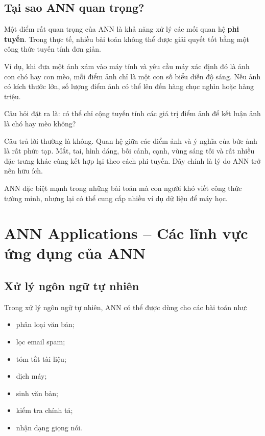 \subsection{Tại sao ANN quan trọng?}

Một điểm rất quan trọng của ANN là khả năng xử lý các mối quan hệ \textbf{phi tuyến}. Trong thực tế, nhiều bài toán không thể được giải quyết tốt bằng một công thức tuyến tính đơn giản.

Ví dụ, khi đưa một ảnh xám vào máy tính và yêu cầu máy xác định đó là ảnh con chó hay con mèo, mỗi điểm ảnh chỉ là một con số biểu diễn độ sáng. Nếu ảnh có kích thước lớn, số lượng điểm ảnh có thể lên đến hàng chục nghìn hoặc hàng triệu.

Câu hỏi đặt ra là: có thể chỉ cộng tuyến tính các giá trị điểm ảnh để kết luận ảnh là chó hay mèo không?

Câu trả lời thường là không. Quan hệ giữa các điểm ảnh và ý nghĩa của bức ảnh là rất phức tạp. Mắt, tai, hình dáng, bối cảnh, cạnh, vùng sáng tối và rất nhiều đặc trưng khác cùng kết hợp lại theo cách phi tuyến. Đây chính là lý do ANN trở nên hữu ích.

\begin{ghinho}
ANN đặc biệt mạnh trong những bài toán mà con người khó viết công thức tường minh, nhưng lại có thể cung cấp nhiều ví dụ dữ liệu để máy học.
\end{ghinho}

\section{ANN Applications -- Các lĩnh vực ứng dụng của ANN}

\subsection{Xử lý ngôn ngữ tự nhiên}

Trong xử lý ngôn ngữ tự nhiên, ANN có thể được dùng cho các bài toán như:

\begin{itemize}
    \item phân loại văn bản;
    \item lọc email spam;
    \item tóm tắt tài liệu;
    \item dịch máy;
    \item sinh văn bản;
    \item kiểm tra chính tả;
    \item nhận dạng giọng nói.
\end{itemize}

